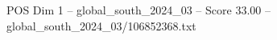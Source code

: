 \begin{textsample}{POS Dim 1 – global\_south\_2024\_03 – Score 33.00 – global\_south\_2024\_03/106852368.txt}
\end{textsample}
